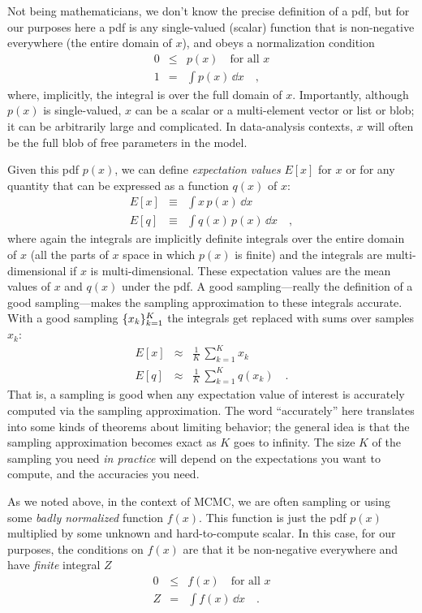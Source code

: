 \documentclass[12pt,twoside,pdftex]{article}
\begin{document}
Not being mathematicians, we don't know the precise definition of a
pdf, but for our purposes here a pdf is
any single-valued (scalar) function that is non-negative everywhere
(the entire domain of $x$), and obeys a normalization condition
\begin{eqnarray}
0 &\leq& p(x) \quad \mbox{for all $x$}
\\
1 &=& \int p(x)\,\dd x
\quad ,
\end{eqnarray}
where, implicitly, the integral is over the full domain of $x$.
Importantly, although $p(x)$ is single-valued, $x$ can be a scalar or
a multi-element vector or list or blob; it can be arbitrarily large
and complicated.
In data-analysis contexts, $x$ will often be the full blob of free
parameters in the model.

Given this pdf $p(x)$, we can define \emph{expectation values} $E[x]$
for $x$ or for any quantity that can be expressed as a function $q(x)$
of $x$:
\begin{eqnarray}
E[x] &\equiv& \int x\,p(x)\,\dd x
\\
E[q] &\equiv& \int q(x)\,p(x)\,\dd x
\quad ,
\end{eqnarray}
where again the integrals are implicitly definite integrals over the
entire domain
of $x$ (all the parts of $x$ space in which $p(x)$ is finite) and the
integrals are multi-dimensional if $x$ is multi-dimensional.
These expectation values are the mean values of $x$ and $q(x)$ under
the pdf.  A good sampling---really the definition of a good
sampling---makes the sampling approximation to these integrals
accurate.
With a good sampling $\{{x_k}\}_{k=1}^K$ the integrals get replaced
with sums over samples $x_k$:
\begin{eqnarray}
E[x] &\approx& \frac{1}{K}\,\sum_{k=1}^K x_k
\\
E[q] &\approx& \frac{1}{K}\,\sum_{k=1}^K q(x_k)
\quad .
\end{eqnarray}
That is, a sampling is good when any expectation value of interest is
accurately computed via the sampling approximation.
The word ``accurately'' here translates into some kinds of theorems
about limiting behavior; the general idea is that the sampling
approximation becomes exact as $K$ goes to infinity.
The size $K$ of the sampling you need \emph{in practice} will depend
on the expectations you want to compute, and the accuracies you need.

As we noted above, in the context of MCMC, we are often sampling or
using some \emph{badly normalized} function $f(x)$.
This function is just the pdf $p(x)$ multiplied by some unknown and
hard-to-compute scalar.
In this case, for our purposes, the conditions on $f(x)$ are that it
be non-negative everywhere and have \emph{finite} integral $Z$
\begin{eqnarray}
0 &\leq& f(x) \quad \mbox{for all $x$}
\\
Z &=& \int f(x)\,\dd x
\quad .
\end{eqnarray}
\end{document}
